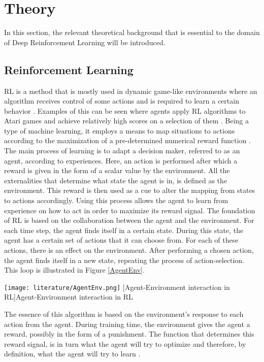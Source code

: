 \section{Theory}
In this section, the relevant theoretical background that is 
essential to the domain of Deep Reinforcement Learning will be introduced. 

\subsection{Reinforcement Learning}
RL is a method that is mostly used in dynamic game-like environments 
where an algorithm receives control of some actions and is required to learn a 
certain behavior \cite{RLBook}. Examples of this can be seen where agents apply RL algorithms to 
Atari games and achieve 
relatively high scores on a selection of them \cite{rlsolvingatari}. Being a type 
of machine learning, it employs a means to map situations to actions according to 
the maximization of a pre-determined numerical reward function \cite{RLBook}. The 
main process of learning is to adapt a decision maker, referred to as an agent, 
according to experiences. Here, an action is performed after which a reward is 
given in 
the form of a scalar value by the environment. 
All the externalities 
that determine what state the agent is in, is defined as the environment. This reward is 
then used as a cue  
to alter the mapping from states to actions accordingly. Using this process allows 
the agent to learn from experience on how to act in order to maximize its reward 
signal. The foundation of RL is based on the collaboration between the agent 
and the environment. For each time step, the agent 
finds itself in a certain state. During this state, the agent has a certain set 
of actions that it can choose from. For each of these actions, there 
is an effect on the environment. After performing a chosen action, the agent finds itself 
in a new state, repeating the process of action-selection. This loop is 
illustrated in Figure \ref{AgentEnv}. 

\begin{Figure}
    \centering
    \texttt{[image: literature/AgentEnv.png]}
    [Agent-Environment interaction in RL]{Agent-Environment interaction in RL \cite{RLBook}}
    \label{AgentEnv}
\end{Figure}

The essence of this algorithm is based on the environment's response to each 
action from the agent. During training time, the environment gives 
the agent a reward, possibly in the form of a punishment. The function that 
determines this reward signal, is in turn what the agent will try to optimize and 
therefore, by definition, what the 
agent will try to learn \cite{RLBook}. 

